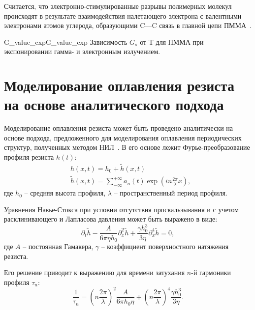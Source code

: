 Считается, что электронно-стимулированные разрывы полимерных молекул происходят в результате взаимодействия налетающего электрона с валентными электронами атомов углерода, образующими C---C связь в главной цепи ПММА~\cite{Stepanova_2006}.

\begin{narrowfig}{G_value_exp}{G_value_exp}
	Зависимость $G_s$ от T для ПММА при экспонировании гамма- и электронным излучением.
\end{narrowfig}







\section{Моделирование оплавления резиста на основе аналитического подхода}
Моделирование оплавления резиста может быть проведено аналитически на основе подхода, предложенного для моделирования оплавления периодических структур, полученных методом НИЛ~\cite{Leveder_2008, Leveder_2011}. В его основе лежит Фурье-преобразование профиля резиста $h(t)$:
\begin{equation}
	\begin{aligned}
	& h(x, t) = h_0 + \tilde{h}(x, t) \\
	& \tilde{h}(x, t) = \sum_{-\infty}^{+\infty} a_n(t) \exp \left(i n \frac{2 \pi}{\lambda} x\right),
	\end{aligned}
\end{equation}
где $h_0$ -- средняя высота профиля, $\lambda$ -- пространственный период профиля.

Уравнения Навье-Стокса при условии отсутствия проскальзывания и с учетом расклинивающего и Лапласова давления может быть выражено в виде:
\begin{equation}
	\partial_t \tilde{h}-\frac{A}{6 \pi \eta h_0} \partial_x^2 \tilde{h}+\frac{\gamma h_0^3}{3 \eta} \partial_x^4 \tilde{h} = 0,
\end{equation}
где $A$ -- постоянная Гамакера, $\gamma$ -- коэффициент поверхностного натяжения резиста.

Его решение приводит к выражению для времени затухания $n$-й гармоники профиля $\tau_n$:
\begin{equation}
	\frac{1}{\tau_n}=\left(n \frac{2 \pi}{\lambda}\right)^2 \frac{A}{6 \pi h_0 \eta}+\left(n \frac{2 \pi}{\lambda}\right)^4 \frac{\gamma h_0^3}{3 \eta}.
\end{equation}

